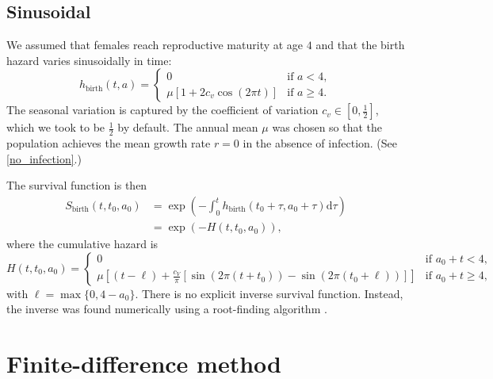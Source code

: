\documentclass{article}
\newcommand{\md}{\mathrm{d}}
\begin{document}
\subsection{Sinusoidal}

We assumed that females reach reproductive maturity at age $4$ and
that the birth hazard varies sinusoidally in time:
\begin{equation}
  h_{\text{birth}}(t, a) =
  \begin{cases}
    0 & \text{if $a < 4$},
    \\
    \mu \left[1
      + 2 c_v \cos\left(2 \pi t\right)\right]
    & \text{if $a \geq 4$}.
  \end{cases}
\end{equation}
The seasonal variation is captured by the coefficient of variation
$c_v \in \left[0, \frac{1}{2}\right]$, which we took to be
$\frac{1}{2}$ by default.  The annual mean $\mu$ was chosen so that
the population achieves the mean growth rate $r = 0$ in the absence of
infection.  (See \autoref{no_infection}.)

The survival function is then
\begin{equation}
  \begin{split}
    S_{\text{birth}}(t, t_0, a_0) &=
    \exp\left(- \int_0^t h_{\text{birth}}(t_0 + \tau, a_0 + \tau) \md
      \tau\right)
    \\
    &=
    \exp\left(- H(t, t_0, a_0)\right),
  \end{split}
\end{equation}
where the cumulative hazard is
\begin{equation}
  H(t, t_0, a_0) =
  \begin{cases}
    0 & \text{if $a_0 + t < 4$},
    \\
    \mu \left[
      (t - \ell)
      + \frac{c_V}{\pi}
      \left[\sin\left(2 \pi (t + t_0)\right)
        - \sin\left(2 \pi (t_0 + \ell)\right)\right]
    \right]
    & \text{if $a_0 + t \geq 4$},
  \end{cases}
\end{equation}
with $\ell = \max\{0, 4 - a_0\}$.  There is no explicit inverse
survival function.  Instead, the inverse was found numerically using a
root-finding algorithm \citep{scipy}.



\section{Finite-difference method}
\end{document}
